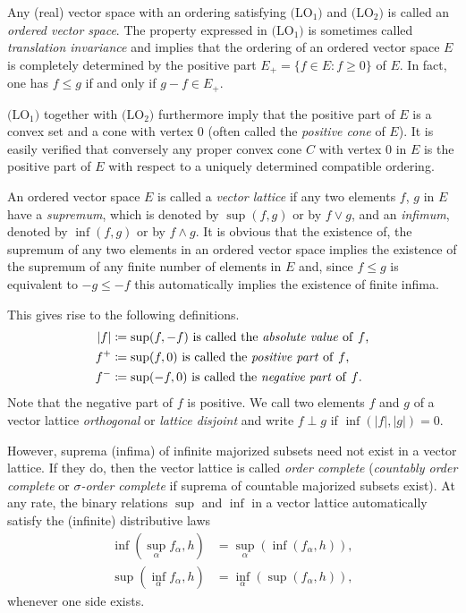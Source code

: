 Any (real) vector space with an ordering satisfying $ \text{(LO$_{1}$)} $ and $ \text{(LO$_{2}$)} $ is called an \emph{ordered vector space}.
The property expressed in $\text{(LO$_{1}$)}$ is sometimes called \emph{translation invariance} and implies that the ordering of an ordered vector space $ E $ is completely determined by the positive part $ E_{+} = \{f \in E \colon f \geq 0\} $ of\/ $ E $.
In fact, one has $ f \leq g $ if and only if\/ $ g - f \in E_{+} $.

$ \text{(LO$_{1}$)} $ together with $ \text{(LO$_{2}$)} $ furthermore imply that the positive part of\/ $ E $ is a convex set and a cone with vertex $ 0 $ (often called the \emph{positive cone} of\/ $ E $).
It is easily verified that conversely any proper convex cone $ C $ with vertex $ 0 $ in $ E $ is the positive part of\/ $ E $ with respect to a uniquely determined compatible ordering.

An ordered vector space $ E $ is called a \emph{vector lattice} if any two elements $ f $, $ g $ in $ E $ have a \emph{supremum}, which is denoted by $ \sup(f,g) $ or by $ f \vee g $, and an \emph{infimum}, denoted by $ \inf(f,g) $ or by $ f \wedge g $.
It is obvious that the existence of, \eg the supremum of any two elements in an ordered vector space implies the existence of the supremum of any finite number of elements in $ E $ and, since $ f \leq g $ is equivalent to $ -g \leq -f $ this automatically implies the existence of finite infima.

This gives rise to the following definitions.
\begin{align*}
	|f| 	& \coloneq \sup(f,-f)  \text{ is called the \emph{absolute value} of\/ $ f $,} \\
	f^{+}	& \coloneq \sup(f,0)   \text{ is called the \emph{positive part} of\/ $ f $,} \\
	f^{-}	& \coloneq \sup(-f,0)  \text{ is called the \emph{negative part} of\/ $ f $.}
\end{align*}
Note that the negative part of\/ $ f $ is positive.
We call two elements $ f $ and $ g $ of a vector lattice \emph{orthogonal} or \emph{lattice disjoint} and write $ f \perp g $ if\/ $ \inf(|f|,|g|) = 0 $.

However, suprema (infima) of infinite majorized subsets need not exist in a vector lattice.
If they do, then the vector lattice is called \emph{order complete} (\emph{countably order complete} or \emph{$ \sigma $-order complete} if suprema of countable majorized subsets exist).
At any rate, the binary relations $\sup$ and $\inf$ in a vector lattice automatically satisfy the (infinite) distributive laws
\begin{align*}
\inf(\sup_{\alpha} f_{\alpha},h) & = \sup_{\alpha}  ( \inf(f_{\alpha},h)  ) , \\
\sup(\inf_{\alpha}f_{\alpha},h) & = \inf_{\alpha}(\sup(f_{\alpha},h)),
\end{align*}
whenever one side exists.

